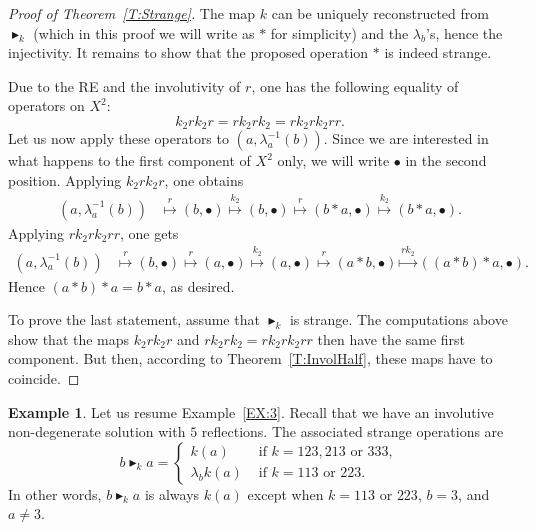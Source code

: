 \documentclass{amsart}
\newcommand\klop{\mathrel{\blacktriangleright_k}}
\theoremstyle{plain}
\theoremstyle{definition}
\newtheorem{exa}[thm]{Example}
\theoremstyle{remark}
\begin{document}
\begin{proof}[Proof of Theorem~\ref{T:Strange}]
The map $k$ can be uniquely reconstructed from $\klop$ (which in this proof we will write as $\ast$ for simplicity) and the $\lambda_b$'s, hence the injectivity. It remains to show that the proposed operation $\ast$ is indeed strange.

Due to the RE and the involutivity of $r$, one has the following equality of operators on $X^2$:
\[k_2rk_2r=rk_2rk_2=rk_2rk_2rr.\]
Let us now apply these operators to $(a,\lambda_a^{-1}(b))$. Since we are interested in what happens to the first component of $X^2$ only, we will write $\bullet$ in the second position. Applying $k_2rk_2r$, one obtains
\begin{align*}
(a,\lambda_a^{-1}(b)) &\overset{r}{\longmapsto} (b,\bullet) \overset{k_2}{\longmapsto} (b,\bullet) \overset{r}{\longmapsto} (b \ast a,\bullet)\overset{k_2}{\longmapsto} (b \ast a,\bullet).
\end{align*} 
Applying $rk_2rk_2rr$, one gets
\begin{align*}
(a,\lambda_a^{-1}(b)) &\overset{r}{\longmapsto} (b,\bullet) \overset{r}{\longmapsto} (a,\bullet)\overset{k_2}{\longmapsto} (a,\bullet) \overset{r}{\longmapsto} (a \ast b,\bullet) \overset{rk_2}{\longmapsto} ((a \ast b) \ast a,\bullet).
\end{align*} 
Hence $(a \ast b) \ast a = b \ast a$, as desired.

To prove the last statement, assume that $\klop$ is strange. The computations above show that the maps $k_2rk_2r$ and $rk_2rk_2=rk_2rk_2rr$ then have the same first component. But then, according to Theorem~\ref{T:InvolHalf}, these maps have to coincide.
\end{proof}

\begin{exa}\label{EX:3ter}
Let us resume Example~\ref{EX:3}. Recall that we have an involutive non-degenerate solution with $5$ reflections. The associated strange operations are
\[b \klop a = \begin{cases} k(a) & \text{ if } k= 123, 213 \text{ or } 333,\\
\lambda_b k(a) & \text{ if } k= 113 \text{ or } 223.\end{cases}\]
In other words, $b \klop a$ is always $k(a)$ except when $k= 113 \text{ or } 223$, $b=3$, and $a \neq 3$.
\end{exa}
\end{document}
